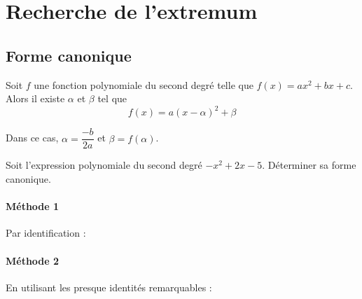 \documentclass{article}
\begin{document}
\section{Recherche de l'extremum}
\subsection{Forme canonique}
\begin{tcolorbox}
\begin{proposition}
Soit $f$ une fonction polynomiale du second degré telle que $f(x) = ax^2 + bx + c$. Alors il existe $\alpha$ et $\beta$ tel que
\begin{equation*}
f(x) = a(x - \alpha)^2 + \beta
\end{equation*}
\end{proposition}
\end{tcolorbox}
\emptybox{10cm}

\begin{remark}
Dans ce cas, $\alpha = \dfrac{-b}{2a}$ et $\beta = f(\alpha)$.
\end{remark}
\begin{example}
Soit l'expression polynomiale du second degré $- x^2 + 2x - 5$. Déterminer sa forme canonique.
\paragraph{Méthode 1}
Par identification :

\emptybox{3cm}
\paragraph{Méthode 2} En utilisant les \og presque \fg identités remarquables :

\emptybox{3cm}
\end{example}
\newpage
\end{document}
